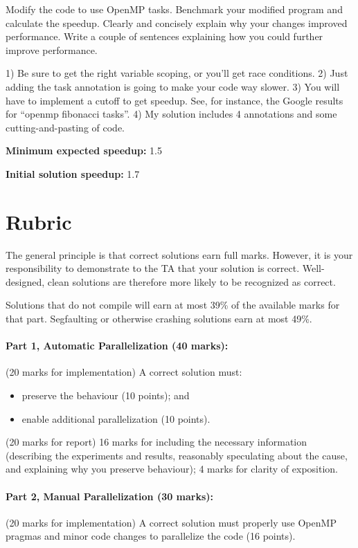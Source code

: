 \documentclass[letterpaper,10pt]{article}
\begin{document}
Modify the code to use OpenMP tasks. Benchmark your modified program
and calculate the speedup. Clearly and concisely explain why your
changes improved performance. Write a couple of sentences explaining how
you could further improve performance.

\vspace*{1em}
 1) Be sure to get the right variable scoping, or
you'll get race conditions. 2) Just adding the task annotation is going
to make your code way slower. 3) You will have to implement a cutoff to
get speedup. See, for instance, the Google results for ``openmp
fibonacci tasks''. 4) My solution includes 4 annotations and some
cutting-and-pasting of code.

\squishlist
  \item {\bf Minimum expected speedup:} 1.5
  \item {\bf Initial solution speedup:} 1.7
\squishend

\section*{Rubric}

The general principle is that correct solutions earn full marks.
However, it is your responsibility to demonstrate to the TA
that your solution is correct. Well-designed, clean solutions 
are therefore more likely to be recognized as correct. 

Solutions that do not compile will earn at most 39\% of the available
marks for that part. Segfaulting or otherwise crashing solutions earn
at most 49\%.

\paragraph{Part 1, Automatic Parallelization (40 marks):}  (20 marks for implementation) A correct solution must:
\begin{itemize}
	\item preserve the behaviour (10 points); and
	\item enable additional parallelization (10 points).
\end{itemize}
 
(20 marks for report) 16 marks for including the necessary information
(describing the experiments and results, reasonably speculating about
the cause, and explaining why you preserve behaviour); 4 marks for
clarity of exposition.

\paragraph{Part 2, Manual Parallelization (30 marks):} (20 marks for implementation) A correct solution must properly use OpenMP pragmas and minor code changes to parallelize the code (16 points).
\end{document}
